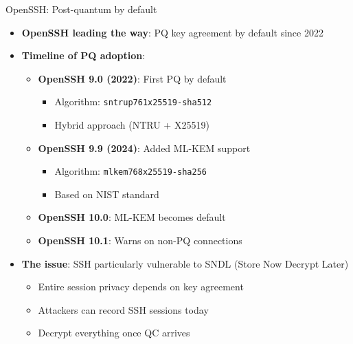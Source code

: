 \documentclass[aspectratio=169, lualatex]{beamer} %
\begin{document}
\begin{frame}{OpenSSH: Post-quantum by default}
	\begin{itemize}
		\item \textbf{OpenSSH leading the way}: PQ key agreement by default since 2022
		\item \textbf{Timeline of PQ adoption}:
		      \begin{itemize}
			      \item \textbf{OpenSSH 9.0 (2022)}: First PQ by default
			            \begin{itemize}
				            \item Algorithm: \texttt{sntrup761x25519-sha512}
				            \item Hybrid approach (NTRU + X25519)
			            \end{itemize}
			      \item \textbf{OpenSSH 9.9 (2024)}: Added ML-KEM support
			            \begin{itemize}
				            \item Algorithm: \texttt{mlkem768x25519-sha256}
				            \item Based on NIST standard
			            \end{itemize}
			      \item \textbf{OpenSSH 10.0}: ML-KEM becomes default
			      \item \textbf{OpenSSH 10.1}: Warns on non-PQ connections
		      \end{itemize}
		\item \textbf{The issue}: SSH particularly vulnerable to SNDL (Store Now Decrypt Later)
		      \begin{itemize}
			      \item Entire session privacy depends on key agreement
			      \item Attackers can record SSH sessions today
			      \item Decrypt everything once QC arrives
		      \end{itemize}
	\end{itemize}
\end{frame}
\end{document}
